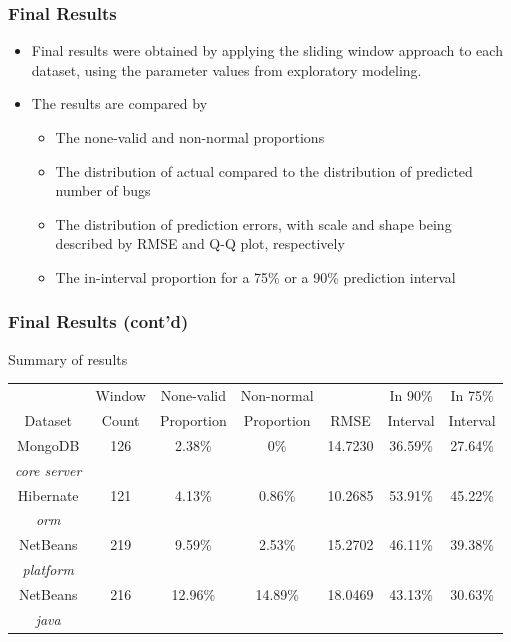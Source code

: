 \documentclass[presentation]{beamer}
\begin{document}
\begin{frame}[t]
\frametitle{Final Results}
\begin{itemize}
\item{Final results were obtained by applying the sliding window approach to each dataset, using the parameter values from exploratory modeling.}
\item{The results are compared by
\begin{itemize}
\item{The none-valid and non-normal proportions}
\item{The distribution of actual compared to the distribution of predicted number of bugs}
\item{The distribution of prediction errors, with scale and shape being described by RMSE and Q-Q plot, respectively}
\item{The in-interval proportion for a 75\% or a 90\% prediction interval}
\end{itemize}
}
\end{itemize}
\end{frame}

\begin{frame}[t]
\frametitle{Final Results (cont'd)}
Summary of results
\begin{table}[htbp]
  \scriptsize
  \centering
  \begin{tabular}{ c | c | c | c | c | c | c }
  \hline
    & Window & None-valid & Non-normal &  & In 90\% & In 75\% \\
  Dataset & Count & Proportion & Proportion & RMSE & Interval & Interval \\
  \hline
  MongoDB & 126 & 2.38\% & 0\% & 14.7230 & 36.59\% & 27.64\% \\
  \textit{core server} &  &  &  &  &  &  \\
  Hibernate & 121 & 4.13\% & 0.86\% & 10.2685 & 53.91\% & 45.22\% \\
  \textit{orm} &  &  &  &  &  &  \\
  NetBeans & 219 & 9.59\% & 2.53\% & 15.2702 & 46.11\% & 39.38\% \\
  \textit{platform} &  &  &  &  &  &  \\
  NetBeans & 216 & 12.96\% & 14.89\% & 18.0469 & 43.13\% & 30.63\% \\
  \textit{java} &  &  &  &  &  &  \\
  \hline
  \end{tabular}
\end{table}
\end{frame}
\end{document}
